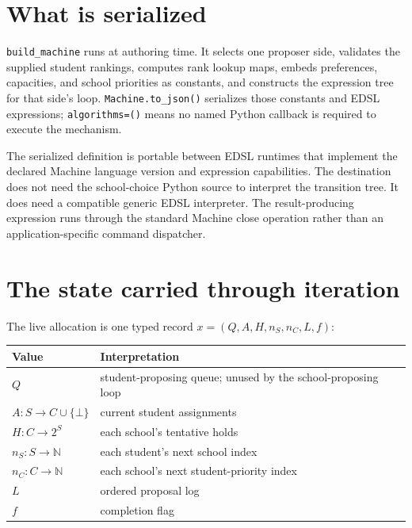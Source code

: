 \documentclass[11pt]{article}
\begin{document}
\section{What is serialized}
\texttt{build\_machine} runs at authoring time. It selects one proposer side, validates the supplied student rankings, computes rank lookup maps, embeds preferences, capacities, and school priorities as constants, and constructs the expression tree for that side's loop. \texttt{Machine.to\_json()} serializes those constants and EDSL expressions; \texttt{algorithms=()} means no named Python callback is required to execute the mechanism.



The serialized definition is portable between EDSL runtimes that implement the declared Machine language version and expression capabilities. The destination does not need the school-choice Python source to interpret the transition tree. It does need a compatible generic EDSL interpreter. The result-producing expression runs through the standard Machine close operation rather than an application-specific command dispatcher.

\section{The state carried through iteration}
The live allocation is one typed record $x=(Q,A,H,n_S,n_C,L,f)$:
\begin{center}
\begin{tabular}{ll}
\toprule
Value & Interpretation \\
\midrule
$Q$ & student-proposing queue; unused by the school-proposing loop \\
$A:S\to C\cup\{\bot\}$ & current student assignments \\
$H:C\to 2^S$ & each school's tentative holds \\
$n_S:S\to\mathbb{N}$ & each student's next school index \\
$n_C:C\to\mathbb{N}$ & each school's next student-priority index \\
$L$ & ordered proposal log \\
$f$ & completion flag \\
\bottomrule
\end{tabular}
\end{center}
\end{document}
